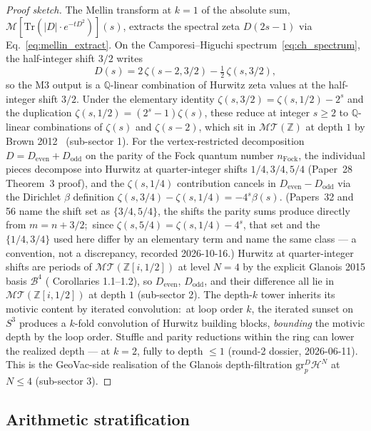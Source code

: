 \documentclass[11pt,a4paper]{article}
\theoremstyle{plain}
\theoremstyle{definition}
\newcommand{\sthree}{S^{3}}
\newcommand{\Z}{\mathbb{Z}}
\newcommand{\Q}{\mathbb{Q}}
\newcommand{\Tr}{\mathrm{Tr}}
\newcommand{\MT}{\mathcal{MT}}
\newcommand{\Hcal}{\mathcal{H}}
\newcommand{\Mcal}{\mathcal{M}}
\newcommand{\Bcal}{\mathcal{B}}
\begin{document}
\begin{proof}[Proof sketch]
The Mellin transform at $k = 1$ of the absolute sum,
$\Mcal[\Tr(|D| \cdot e^{-tD^2})](s)$, extracts the spectral zeta
$D(2s - 1)$ via Eq.~\eqref{eq:mellin_extract}.  On the
Camporesi--Higuchi spectrum~\eqref{eq:ch_spectrum}, the half-integer
shift $3/2$ writes
\[
D(s) = 2\,\zeta(s-2, 3/2) - \tfrac{1}{2}\,\zeta(s, 3/2),
\]
so the M3 output is a $\Q$-linear combination of Hurwitz zeta values
at the half-integer shift $3/2$.  Under the elementary identity
$\zeta(s, 3/2) = \zeta(s, 1/2) - 2^s$ and the duplication
$\zeta(s, 1/2) = (2^s - 1)\zeta(s)$, these reduce at integer $s \ge 2$
to $\Q$-linear combinations of $\zeta(s)$ and $\zeta(s-2)$, which sit
in $\MT(\Z)$ at depth $1$ by Brown 2012~\cite{brown2012} (sub-sector
1).  For the vertex-restricted decomposition
$D = D_{\mathrm{even}} + D_{\mathrm{odd}}$ on the parity of the Fock
quantum number $n_{\mathrm{Fock}}$, the individual pieces decompose
into Hurwitz at quarter-integer shifts $1/4, 3/4, 5/4$ (Paper~28
Theorem~3 proof), and the $\zeta(s, 1/4)$ contribution cancels in
$D_{\mathrm{even}} - D_{\mathrm{odd}}$ via the Dirichlet $\beta$
definition
$\zeta(s, 3/4) - \zeta(s, 1/4) = -4^s \beta(s)$.  (Papers~32 and 56
name the shift set as $\{3/4, 5/4\}$, the shifts the parity sums
produce directly from $m = n + 3/2$;\ since
$\zeta(s, 5/4) = \zeta(s, 1/4) - 4^{s}$, that set and the
$\{1/4, 3/4\}$ used here differ by an elementary term and name the same
class --- a convention, not a discrepancy, recorded 2026-10-16.)  Hurwitz at
quarter-integer shifts are periods of $\MT(\Z[i, 1/2])$ at level
$N = 4$ by the explicit Glanois 2015 basis $\Bcal^4$
(\cite{glanois2015} Corollaries 1.1--1.2), so $D_{\mathrm{even}}$,
$D_{\mathrm{odd}}$, and their difference all lie in
$\MT(\Z[i, 1/2])$ at depth $1$ (sub-sector 2).  The depth-$k$ tower
inherits its motivic content by iterated convolution:\ at loop order
$k$, the iterated sunset on $\sthree$ produces a $k$-fold convolution
of Hurwitz building blocks, \emph{bounding} the motivic depth by the
loop order.  Stuffle and parity reductions within the ring can lower
the realized depth --- at $k = 2$, fully to depth $\le 1$ (round-2
dossier, 2026-06-11).  This is the GeoVac-side realisation of the
Glanois depth-filtration $\mathrm{gr}_p^D \Hcal^N$ at $N \le 4$
(sub-sector 3).
\end{proof}

\subsection{Arithmetic stratification}
\end{document}
